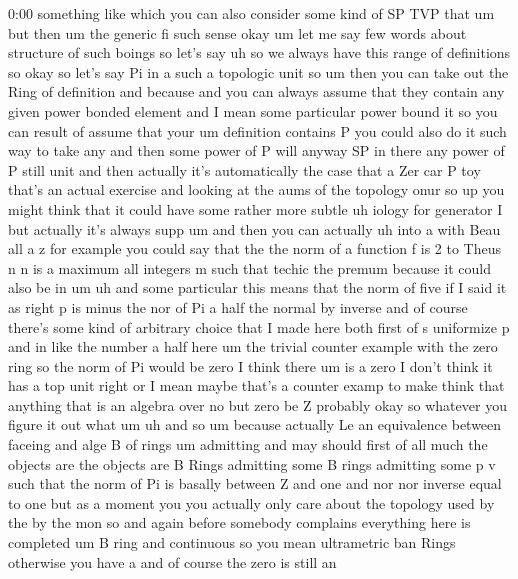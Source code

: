 \begin{unfinished}{0:00}
something
like  which  you  can  also  consider  some
kind  of  SP  TVP
that  um  but
then  um  the  generic  fi
such
sense  okay  um  let  me  say  few  words  about
structure  of  such
boings
so  let's  say
uh  so  we  always  have  this  range  of
definitions  so  okay  so  let's  say  Pi  in  a
such  a  topologic  unit
so  um  then  you  can  take  out  the  Ring  of
definition
and  because  and  you  can  always  assume
that  they  contain  any  given  power  bonded
element  and  I  mean  some  particular  power
bound  it  so  you  can  result  of  assume
that  your  um  definition  contains
P  you  could  also  do  it  such  way  to  take
any  and  then  some  power  of  P  will  anyway
SP  in  there  any  power  of  P  still  unit
and  then  actually  it's  automatically  the
case  that  a  Zer  car  P
toy
that's  an  actual  exercise  and  looking  at
the  aums
of  the  topology  onur  so  up  you  might
think  that  it  could  have  some  rather
more  subtle  uh  iology  for  generator  I
but  actually  it's  always  supp  um  and
then  you  can
actually
uh  into
a
with  Beau
all  a
z  for  example  you  could  say  that  the  the
norm  of  a  function
f
is  2  to  Theus
n  n  is
a  maximum  all  integers  m
such
that  techic  the  premum  because  it  could
also  be  in
um  uh  and  some  particular  this  means
that  the  norm  of  five  if  I  said  it  as
right  p  is
minus  the  nor  of  Pi  a  half  the  normal  by
inverse  and  of  course  there's  some  kind
of  arbitrary  choice  that  I  made  here
both  first  of  s  uniformize  p  and  in  like
the  number  a  half  here
um  the  trivial  counter  example  with  the
zero  ring  so  the  norm  of  Pi  would  be
zero  I  think  there  um
is  a
zero  I  don't  think  it  has  a  top  unit
right  or  I
mean
maybe  that's  a  counter  examp  to  make
think  that  anything  that  is  an  algebra
over  no  but  zero
be
Z  probably  okay  so
whatever  you  figure  it  out
what
um
uh  and  so
um  because  actually  Le  an
equivalence  between
faceing
and  alge  B  of  rings
um
admitting  and  may
should  first  of  all  much  the  objects  are
the  objects  are  B  Rings
admitting  some  B  rings
admitting  some  p
v  such  that  the  norm  of  Pi  is  basally
between  Z  and  one  and  nor  nor  inverse
equal  to
one  but  as  a  moment  you  you  actually
only  care  about  the  topology  used  by  the
by  the  mon  so
and  again  before  somebody  complains
everything  here  is
completed  um
B  ring  and
continuous  so  you  mean  ultrametric  ban
Rings  otherwise  you  have
a  and  of  course  the  zero  is  still  an

\end{unfinished}
